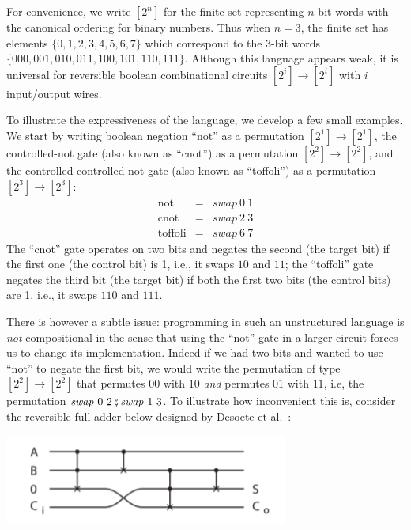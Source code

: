 \documentclass{article}
\begin{document}
For convenience, we write $[2^n]$ for the finite set representing
$n$-bit words with the canonical ordering for binary numbers. Thus
when $n=3$, the finite set has elements $\{0,1,2,3,4,5,6,7\}$ which
correspond to the 3-bit words $\{000,001,010,011,100,101,110,111\}$.
Although this language appears weak, it is universal for reversible
boolean combinational circuits $[2^i] \rightarrow [2^i]$ with $i$
input/output wires. 

To illustrate the expressiveness of the language, we develop a few
small examples. We start by writing boolean negation ``not'' as a
permutation $[2^1] \rightarrow [2^1]$, the controlled-not gate (also
known as ``cnot'') as a permutation $[2^2] \rightarrow [2^2]$, and the
controlled-controlled-not gate (also known as ``toffoli'') as a
permutation $[2^3] \rightarrow [2^3]$:
\[\begin{array}{rcl}
\mbox{not} &=& \mathit{swap}~0~1 \\
\mbox{cnot} &=& \mathit{swap}~2~3 \\
\mbox{toffoli} &=& \mathit{swap}~6~7
\end{array}\]
The ``cnot'' gate operates on two bits and negates the second (the
target bit) if the first one (the control bit) is 1, i.e., it swaps
$10$ and $11$; the ``toffoli'' gate negates the third bit (the target
bit) if both the first two bits (the control bits) are 1, i.e., it
swaps $110$ and $111$.

There is however a subtle issue: programming in such an unstructured
language is \emph{not} compositional in the sense that using the
``not'' gate in a larger circuit forces us to change its
implementation. Indeed if we had two bits and wanted to use ``not'' to
negate the first bit, we would write the permutation of type
$[2^2] \rightarrow [2^2]$ that permutes $00$ with $10$ \emph{and}
permutes $01$ with $11$, i.e, the permutation
$\mathit{swap}~0~2 \fatsemi \mathit{swap}~1~3$. To illustrate
how inconvenient this is, consider the reversible full adder
below designed by Desoete et al.~\cite{117414}:

\begin{center}
\includegraphics[scale=0.6]{full-adder.png}
\end{center}
\end{document}
